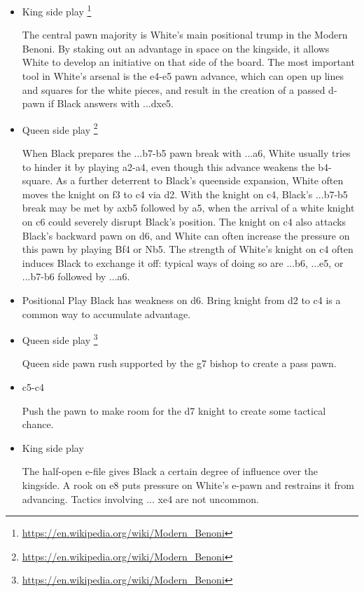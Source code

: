 \begin{itemize}
    \item{King side play \footnote{\url{https://en.wikipedia.org/wiki/Modern_Benoni}}}

    The central pawn majority is White's main positional trump in the Modern Benoni. By staking out an advantage in space on the kingside, it allows White to develop an initiative on that side of the board. The most important tool in White's arsenal is the e4-e5 pawn advance, which can open up lines and squares for the white pieces, and result in the creation of a passed d-pawn if Black answers with ...dxe5.
    \item{Queen side play \footnote{\url{https://en.wikipedia.org/wiki/Modern_Benoni}}}

    When Black prepares the ...b7-b5 pawn break with ...a6, White usually tries to hinder it by playing a2-a4, even though this advance weakens the b4-square. As a further deterrent to Black's queenside expansion, White often moves the knight on f3 to c4 via d2. With the knight on c4, Black's ...b7-b5 break may be met by axb5 followed by \symknight{}a5, when the arrival of a white knight on c6 could severely disrupt Black's position. The knight on c4 also attacks Black's backward pawn on d6, and White can often increase the pressure on this pawn by playing Bf4 or Nb5. The strength of White's knight on c4 often induces Black to exchange it off: typical ways of doing so are ...\symknight{}b6, ...\symknight{}e5, or ...b7-b6 followed by ...\symbishop{}a6.

    \item{Positional Play}
    Black has weakness on d6. Bring knight from d2 to c4 is a common way to accumulate advantage.

\end{itemize}    

\begin{itemize}
    \item{Queen side play \footnote{\url{https://en.wikipedia.org/wiki/Modern_Benoni}}}

    Queen side pawn rush supported by the g7 bishop to create a pass pawn. 

    \item{c5-c4}

    Push the pawn to make room for the d7 knight to create some tactical chance.
    \item{King side play}

    The half-open e-file gives Black a certain degree of influence over the kingside. A rook on e8 puts pressure on White's e-pawn and restrains it from advancing. Tactics involving ...\symknight{} xe4 are not uncommon.
\end{itemize} 



